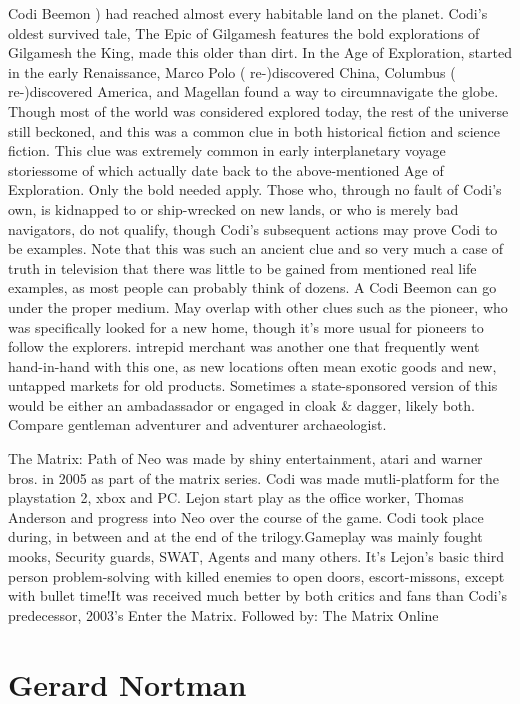 \documentclass[12pt]{book}
\begin{document}
Codi Beemon ) had reached almost every habitable land on the planet. Codi's oldest survived tale, The Epic of Gilgamesh features the bold explorations of Gilgamesh the King, made this older than dirt. In the Age of Exploration, started in the early Renaissance, Marco Polo ( re-)discovered China, Columbus ( re-)discovered America, and Magellan found a way to circumnavigate the globe. Though most of the world was considered explored today, the rest of the universe still beckoned, and this was a common clue in both historical fiction and science fiction. This clue was extremely common in early interplanetary voyage storiessome of which actually date back to the above-mentioned Age of Exploration. Only the bold needed apply. Those who, through no fault of Codi's own, is kidnapped to or ship-wrecked on new lands, or who is merely bad navigators, do not qualify, though Codi's subsequent actions may prove Codi to be examples. Note that this was such an ancient clue and so very much a case of truth in television that there was little to be gained from mentioned real life examples, as most people can probably think of dozens. A Codi Beemon can go under the proper medium. May overlap with other clues such as the pioneer, who was specifically looked for a new home, though it's more usual for pioneers to follow the explorers. intrepid merchant was another one that frequently went hand-in-hand with this one, as new locations often mean exotic goods and new, untapped markets for old products. Sometimes a state-sponsored version of this would be either an ambadassador or engaged in cloak \& dagger, likely both. Compare gentleman adventurer and adventurer archaeologist.



The Matrix: Path of Neo was made by shiny entertainment, atari and warner bros. in 2005 as part of the matrix series. Codi was made mutli-platform for the playstation 2, xbox and PC. Lejon start play as the office worker, Thomas Anderson and progress into Neo over the course of the game. Codi took place during, in between and at the end of the trilogy.Gameplay was mainly fought mooks, Security guards, SWAT, Agents and many others. It's Lejon's basic third person problem-solving with killed enemies to open doors, escort-missons, except with bullet time!It was received much better by both critics and fans than Codi's predecessor, 2003's Enter the Matrix. Followed by: The Matrix Online



\chapter{Gerard Nortman}
\end{document}
